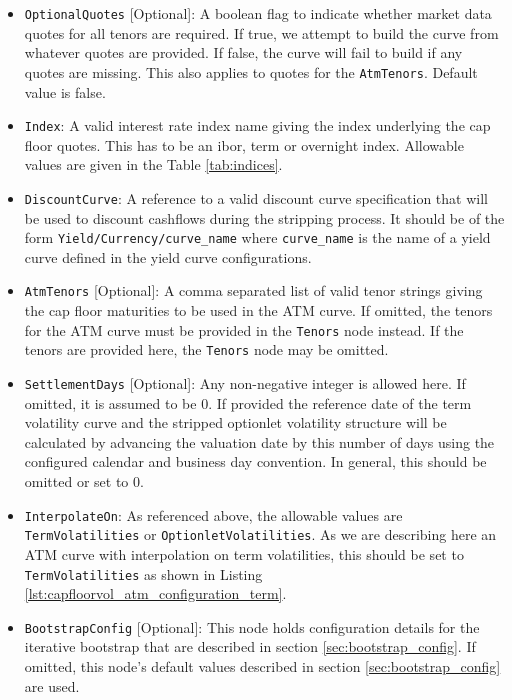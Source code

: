 \begin{itemize}
\item \lstinline!OptionalQuotes! [Optional]:
A boolean flag to indicate whether market data quotes for all tenors are required. If true, we attempt to build the curve from whatever quotes are provided. If false, the curve will fail to build if any quotes are missing. This also applies to quotes for the \lstinline!AtmTenors!. Default value is false.

\item \lstinline!Index!:
A valid interest rate index name giving the index underlying the cap floor quotes. This has to be an ibor, term or overnight index. Allowable values are given in the Table \ref{tab:indices}.

\item \lstinline!DiscountCurve!:
A reference to a valid discount curve specification that will be used to discount cashflows during the stripping process. It should be of the form \lstinline!Yield/Currency/curve_name! where \lstinline!curve_name! is the name of a yield curve defined in the yield curve configurations.

\item \lstinline!AtmTenors! [Optional]:
A comma separated list of valid tenor strings giving the cap floor maturities to be used in the ATM curve. If omitted, the tenors for the ATM curve must be provided in the \lstinline!Tenors! node instead. If the tenors are provided here, the \lstinline!Tenors! node may be omitted.

\item \lstinline!SettlementDays! [Optional]:
Any non-negative integer is allowed here. If omitted, it is assumed to be 0. If provided the reference date of the term volatility curve and the stripped optionlet volatility structure will be calculated by advancing the valuation date by this number of days using the configured calendar and business day convention. In general, this should be omitted or set to 0.

\item \lstinline!InterpolateOn!:
As referenced above, the allowable values are \lstinline!TermVolatilities! or \lstinline!OptionletVolatilities!. As we are describing here an ATM curve with interpolation on term volatilities, this should be set to \lstinline!TermVolatilities! as shown in Listing \ref{lst:capfloorvol_atm_configuration_term}.

\item \lstinline!BootstrapConfig! [Optional]:
This node holds configuration details for the iterative bootstrap that are described in section \ref{sec:bootstrap_config}. If omitted, this node's default values described in section \ref{sec:bootstrap_config} are used.


\end{itemize}
